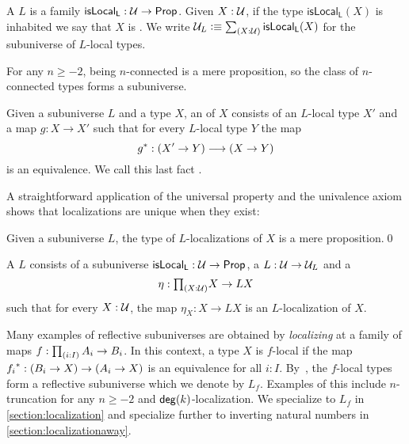 \begin{defn}
    A  $L$ is a family $\mathsf{isLocal_L}:\mathcal{U} \to\mathsf{Prop}$.
    Given $X : \mathcal{U}$, if the type $\mathsf{isLocal_L}(X)$ is inhabited 
    we say that $X$ is .
    We write $\UU_L \defeq \sm{X:\UU} \mathsf{isLocal_L}(X)$ for the subuniverse of
    $L$-local types.
\end{defn}

\begin{eg}\label{example:localizationatmaps}
    For any $n\geq -2$, being $n$-connected is a mere proposition, so the class of $n$-connected types
    forms a subuniverse.
\end{eg}

\begin{defn}
Given a subuniverse $L$ and a type $X$, an  of $X$ consists of an $L$-local type
$X'$ and a map $g : X \to X'$ such that for every $L$-local type $Y$ the map
\[
  {g}^\ast : (X'\to Y) \longrightarrow (X\to Y)
\]
is an equivalence. We call this last fact .
\end{defn}

A straightforward application of the universal property and the univalence axiom
shows that localizations are unique when they exist:

\begin{lem}
Given a subuniverse $L$, the type of $L$-localizations of $X$ is a mere proposition.\qed
\end{lem}

\begin{defn}
A  $L$ consists of a subuniverse $\mathsf{isLocal_L}:\mathcal{U}\to\mathsf{Prop}$,
a  $L:\mathcal{U}\to\mathcal{U}_L$
and a 
\[
  \eta : \prd{X:\UU}X \to LX
\]
such that for every $X : \mathcal{U}$, the
map $\eta_X : X \to LX$ is an $L$-localization of $X$.
\end{defn}

\begin{eg}\label{example:subuniversemaps}
Many examples of reflective subuniverses are obtained by \emph{localizing} at a family of maps $f:\prd{i:I}A_i\to B_i$.
In this context, a type $X$ is $f$-local if the map ${f_i}^\ast : (B_i \to X) \to (A_i \to X)$ is an equivalence
for all $i : I$.
By~\cite[Theorem 2.16]{RijkeShulmanSpitters}, the $f$-local types form a reflective subuniverse which we denote by $L_f$.
Examples of this include $n$-truncation for any $n \geq -2$ and $\mathsf{deg}(k)$-localization.
We specialize to $L_f$ in \cref{section:localization} and specialize further
to inverting natural numbers in \cref{section:localizationaway}.
\end{eg}

